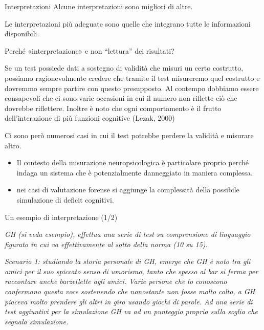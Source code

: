 \documentclass[
  ignorenonframetext,
  aspectratio=169,
]{beamer}
\providecommand{\tightlist}{%
  \setlength{\itemsep}{0pt}\setlength{\parskip}{0pt}}
\begin{document}
\begin{frame}{Interpretazioni}
\label{interpretazioni}
Alcune interpretazioni sono migliori di altre.

Le interpretazioni più adeguate sono quelle che integrano tutte le
informazioni disponibili.
\end{frame}

\begin{frame}{Perché «interpretazione» e non ``lettura'' dei risultati?}
\label{perchuxe9-interpretazione-e-non-lettura-dei-risultati}
\small

Se un test possiede dati a sostegno di validità che misuri un certo
costrutto, possiamo ragionevolmente credere che tramite il test
misureremo quel costrutto e dovremmo sempre partire con questo
presupposto. Al contempo dobbiamo essere consapevoli che ci sono varie
occasioni in cui il numero non riflette ciò che dovrebbe riflettere.
Inoltre è noto che ogni comportamento è il frutto dell'interazione di
più funzioni cognitive (Lezak, 2000)

Ci sono però numerosi casi in cui il test potrebbe perdere la validità e
misurare altro.

\begin{itemize}
\tightlist
\item
  Il contesto della misurazione neuropsicologica è particolare proprio
  perché indaga un sistema che è potenzialmente danneggiato in maniera
  complessa.\\
\item
  nei casi di valutazione forense si aggiunge la complessità della
  possibile simulazione di deficit cognitivi.
\end{itemize}
\end{frame}

\begin{frame}{Un esempio di interpretazione (1/2)}
\label{un-esempio-di-interpretazione-12}
\small

\emph{GH (si veda esempio), effettua una serie di test su comprensione
di linguaggio figurato in cui va effettivamente al sotto della norma (10
su 15).}

\emph{Scenario 1: studiando la storia personale di GH, emerge che GH è
noto tra gli amici per il suo spiccato senso di umorismo, tanto che
spesso al bar si ferma per raccontare anche barzellette agli amici.
Varie persone che lo conoscono confermano questa voce sostenendo che
nonostante non fosse molto colto, a GH piaceva molto prendere gli altri
in giro usando giochi di parole. Ad una serie di test aggiuntivi per la
simulazione GH va ad un punteggio proprio sulla soglia che segnala
simulazione.}
\end{frame}
\end{document}
